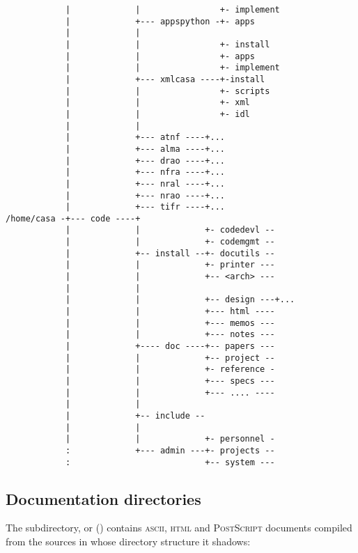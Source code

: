 \begin{verbatim}
            |             |                +- implement
            |             +--- appspython -+- apps
            |             |                
            |             |                +- install
            |             |                +- apps
            |             |                +- implement
            |             +--- xmlcasa ----+-install
            |             |                +- scripts
            |             |                +- xml
            |             |                +- idl
            |             |
            |             +--- atnf ----+...
            |             +--- alma ----+...
            |             +--- drao ----+...
            |             +--- nfra ----+...
            |             +--- nral ----+...
            |             +--- nrao ----+...
            |             +--- tifr ----+...
/home/casa -+--- code ----+
            |             |             +- codedevl --
            |             |             +- codemgmt --
            |             +-- install --+- docutils --
            |             |             +- printer ---
            |             |             +-- <arch> ---
            |             |
            |             |             +-- design ---+...
            |             |             +--- html ----
            |             |             +--- memos ---
            |             |             +--- notes ---
            |             +---- doc ----+-- papers ---
            |             |             +-- project --
            |             |             +- reference -
            |             |             +--- specs ---
            |             |             +--- .... ----
            |             |
            |             +-- include --
            |             |
            |             |             +- personnel -
            :             +--- admin ---+- projects --
            :                           +-- system ---
\end{verbatim}


\subsection{Documentation directories}
\label{Documentation directories}

The  subdirectory, or  ()
contains \textsc{ascii}, \textsc{html} and \textsc{PostScript} documents
compiled from the sources in  whose directory structure
it shadows:


